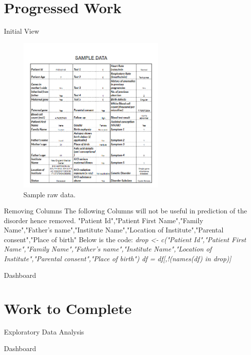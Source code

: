 \documentclass{beamer}
\begin{document}
	\section{Progressed Work}
		\begin{frame}{Initial View}
			\begin{figure}
				\includegraphics[width=0.65\textwidth, height=0.72\textheight]{sample.png}
				\caption{Sample raw data.}
			\end{figure}
		\end{frame}
		\begin{frame}{Removing Columns}
			The following Columns will not be useful in prediction of the disorder hence removed.\newline
			"Patient Id","Patient First Name","Family Name","Father's name","Institute Name","Location of Institute","Parental consent","Place of birth"\newline
			Below is the code:\newline
			\small{\textit{drop <- c("Patient Id","Patient First Name","Family Name","Father's name","Institute Name","Location of Institute","Parental consent","Place of birth")\newline
			df = df[,!(names(df) in drop)]}}
		\end{frame}
	\begin{frame}{Dashboard}
	\end{frame}
	
	\section{Work to Complete}
	\begin{frame}{Exploratory Data Analysis}
	\end{frame}
	
	\begin{frame}{Dashboard}
	\end{frame}
	
\end{document}
